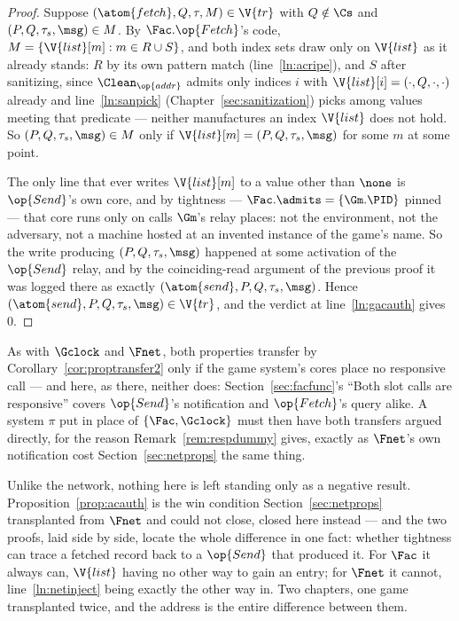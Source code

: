 \documentclass[10pt,oneside,openany]{book}
\theoremstyle{accentdef}
\theoremstyle{accentplain}
\begin{document}
\begin{proof}
Suppose $(\atom{fetch},Q,\tau,M) \in \V{tr}$ with $Q \notin \Cs$ and $(P,Q,\tau_s,\msg) \in M$. By
$\Fac.\op{Fetch}$'s code, $M = \{\V{list}[m] : m \in R \cup S\}$, and both index sets draw only on
$\V{list}$ as it already stands: $R$ by its own pattern match (line~\ref{ln:acripe}), and $S$ after
sanitizing, since $\Clean_{\op{addr}}$ admits only indices $i$ with
$\V{list}[i] = (\cdot,Q,\cdot,\cdot)$ already and line~\ref{ln:sanpick}
(Chapter~\ref{sec:sanitization}) picks among values meeting that predicate --- neither
manufactures an index $\V{list}$ does not hold. So $(P,Q,\tau_s,\msg) \in M$ only if
$\V{list}[m] = (P,Q,\tau_s,\msg)$ for some $m$ at some point.

The only line that ever writes $\V{list}[m]$ to a value other than $\none$ is $\op{Send}$'s own
core, and by tightness --- $\Fac.\admits = \{\Gm.\PID\}$ pinned --- that core runs only on calls
$\Gm$'s relay places: not the environment, not the adversary, not a machine hosted at an invented
instance of the game's name. So the write producing $(P,Q,\tau_s,\msg)$ happened at some
activation of the $\op{Send}$ relay, and by the coinciding-read argument of the previous proof it
was logged there as exactly $(\atom{send},P,Q,\tau_s,\msg)$. Hence
$(\atom{send},P,Q,\tau_s,\msg) \in \V{tr}$, and the verdict at line~\ref{ln:gacauth} gives $0$.
\end{proof}

As with $\Gclock$ and $\Fnet$, both properties transfer by Corollary~\ref{cor:proptransfer2} only
if the game system's cores place no responsive call --- and here, as there, neither does:
Section~\ref{sec:facfunc}'s ``Both slot calls are responsive'' covers $\op{Send}$'s notification
and $\op{Fetch}$'s query alike. A system $\pi$ put in place of $\{\Fac,\Gclock\}$ must then have
both transfers argued directly, for the reason Remark~\ref{rem:respdummy} gives, exactly as
$\Fnet$'s own notification cost Section~\ref{sec:netprops} the same thing.

Unlike the network, nothing here is left standing only as a negative result.
Proposition~\ref{prop:acauth} is the win condition Section~\ref{sec:netprops} transplanted from
$\Fnet$ and could not close, closed here instead --- and the two proofs, laid side by side, locate
the whole difference in one fact: whether tightness can trace a fetched record back to a
$\op{Send}$ that produced it. For $\Fac$ it always can, $\V{list}$ having no other way to gain an
entry; for $\Fnet$ it cannot, line~\ref{ln:netinject} being exactly the other way in. Two
chapters, one game transplanted twice, and the address is the entire difference between them.
\end{document}
